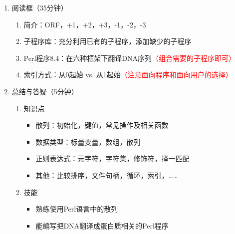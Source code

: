 \documentclass{TIJMUjiaoanLL}
\begin{document}
\begin{enumerate}
\begin{enumerate}
    \end{enumerate}
  \item 阅读框（35分钟）
    \begin{enumerate}
      \item 简介：ORF，+1，+2，+3，-1，-2，-3
      \item 子程序库：充分利用已有的子程序，添加缺少的子程序
      \item Perl程序8.4：在六种框架下翻译DNA序列\textcolor{red}{（组合需要的子程序即可）}
      \item 索引方式：从0起始 vs.  从1起始\textcolor{red}{（注意面向程序和面向用户的选择）}
    \end{enumerate}

\otherTail
\newpage
\otherHeader

  \item 总结与答疑（5分钟）
    \begin{enumerate}
      \item 知识点
	\begin{itemize}
	  \item 散列：初始化，键值，常见操作及相关函数
	  \item 数据类型：标量变量，数组，散列
	  \item 正则表达式：元字符，字符集，修饰符，择一匹配
	  \item 其他：比较排序，文件句柄，循环，索引，……
	\end{itemize}
      \item 技能
	\begin{itemize}
	  \item 熟练使用Perl语言中的散列
	  \item 能编写把DNA翻译成蛋白质相关的Perl程序
	\end{itemize}
    \end{enumerate}
\end{enumerate}

\otherTail
\end{document}
